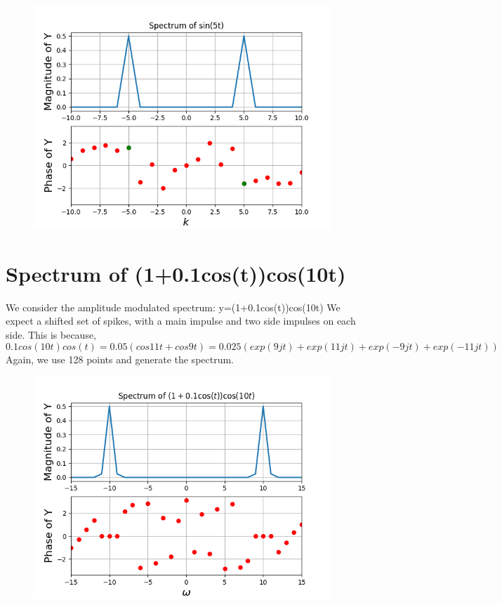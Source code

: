 \documentclass[11pt, a4paper]{article}
\begin{document}
\begin{figure}[!tbh]
\centering
\includegraphics[scale=0.5]{assgn9_plot2.png} 
\label{fig2}
\end{figure} 

\section*{Spectrum of (1+0.1cos(t))cos(10t)}
We consider the amplitude modulated spectrum:
\newline
y=(1+0.1cos(t))cos(10t)
\newline
We expect a shifted set of spikes, with a main impulse and two side impulses on each side. This is because,
\begin{equation*}
0.1cos(10t)cos(t) = 0.05(cos11t + cos9t) = 0.025(exp(9jt)+exp(11jt)+exp(-9jt)+exp(-11jt))
\end{equation*}
\newline
Again, we use 128 points and generate the spectrum.

\begin{figure}[!tbh]
\centering
\includegraphics[scale=0.55]{assgn9_plot3.png} 
\label{fig3}
\end{figure} 
\end{document}
